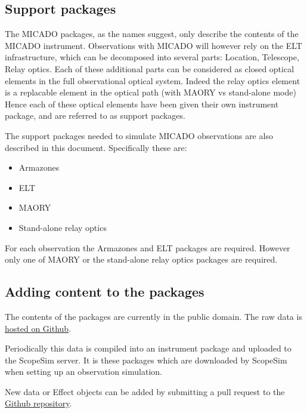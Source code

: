 \subsection{Support packages%
  \label{support-packages}%
}

The MICADO packages, as the names suggest, only describe the contents of the MICADO instrument.
Observations with MICADO will however rely on the ELT infrastructure, which can be decomposed into several parts: Location, Telescope, Relay optics.
Each of these additional parts can be considered as closed optical elements in the full observational optical system.
Indeed the relay optics element is a replacable element in the optical path (with MAORY vs stand-alone mode)
Hence each of these optical elements have been given their own instrument package, and are referred to as support packages.

The support packages needed to simulate MICADO observations are also described in this document. Specifically these are:

\begin{itemize}
\item Armazones

\item ELT

\item MAORY

\item Stand-alone relay optics
\end{itemize}

For each observation the Armazones and ELT packages are required. However only one of MAORY or the stand-alone relay optics packages are required.


\subsection{Adding content to the packages%
  \label{adding-content-to-the-packages}%
}

The contents of the packages are currently in the public domain.
The raw data is \href{https://github.com/astronomyk/irdb}{hosted on Github}.

Periodically this data is compiled into an instrument package and uploaded to the ScopeSim server.
It is these packages which are downloaded by ScopeSim when setting up an observation simulation.

New data or Effect objects can be added by submitting a pull request to the \href{https://github.com/astronomyk/irdb}{Github repository}.


